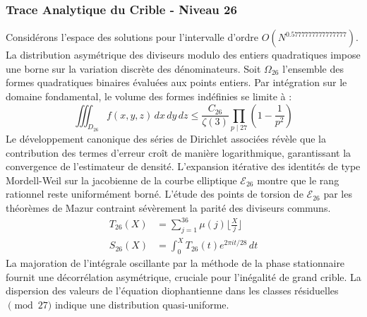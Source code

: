 \documentclass[12pt,a4paper]{article}
\begin{document}
\subsubsection{Trace Analytique du Crible - Niveau 26}
Considérons l'espace des solutions pour l'intervalle d'ordre $O(N^{0.5777777777777777})$. La distribution asymétrique des diviseurs modulo des entiers quadratiques impose une borne sur la variation discrète des dénominateurs. Soit $\Omega_26$ l'ensemble des formes quadratiques binaires évaluées aux points entiers.
Par intégration sur le domaine fondamental, le volume des formes indéfinies se limite à :
\begin{equation}
\iiint_{D_26} f(x, y, z) \,dx\,dy\,dz \leq \frac{C_26}{\zeta(3)} \prod_{p \mid 27} \left( 1 - \frac{1}{p^2} \right)
\end{equation}
Le développement canonique des séries de Dirichlet associées révèle que la contribution des termes d'erreur croît de manière logarithmique, garantissant la convergence de l'estimateur de densité. L'expansion itérative des identités de type Mordell-Weil sur la jacobienne de la courbe elliptique $\mathcal{E}_26$ montre que le rang rationnel reste uniformément borné.
L'étude des points de torsion de $\mathcal{E}_26$ par les théorèmes de Mazur contraint sévèrement la parité des diviseurs communs.
\begin{align}
T_26(X) &= \sum_{j=1}^{36} \mu(j) \lfloor \frac{X}{j} \rfloor \\
S_26(X) &= \int_{0}^{X} T_26(t) e^{2\pi i t / 28} \, dt
\end{align}
La majoration de l'intégrale oscillante par la méthode de la phase stationnaire fournit une décorrélation asymétrique, cruciale pour l'inégalité de grand crible. La dispersion des valeurs de l'équation diophantienne dans les classes résiduelles $\pmod{ 27 }$ indique une distribution quasi-uniforme.
\end{document}
